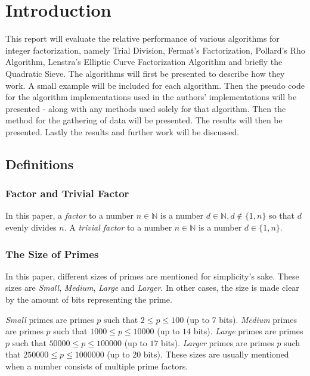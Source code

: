 \chapter{Introduction}

\noindent This report will evaluate the relative performance of various algorithms for integer factorization, namely Trial Division, Fermat's Factorization, Pollard's Rho Algorithm, Lenstra's Elliptic Curve Factorization Algorithm and briefly the Quadratic Sieve. The algorithms will first be presented to describe how they work. A small example will be included for each algorithm. Then the pseudo code for the algorithm implementations used in the authors' implementations will be presented - along with any methods used solely for that algorithm. Then the method for the gathering of data will be presented. The results will then be presented. Lastly the results and further work will be discussed.

\section{Definitions}

\subsection{Factor and Trivial Factor}
In this paper, a \textit{factor} to a number $n\in\mathbb{N}$ is a number $d\in\mathbb{N}, d\notin\{1, n\}$ so that $d$ evenly divides $n$. A \textit{trivial factor} to a number $n\in\mathbb{N}$ is a number $d\in\{1, n\}$.

\subsection{The Size of Primes}
In this paper, different sizes of primes are mentioned for simplicity's sake. These sizes are \textit{Small}, \textit{Medium}, \textit{Large} and \textit{Larger}. In other cases, the size is made clear by the amount of bits representing the prime.

\textit{Small} primes are primes $p$ such that $2\leq p \leq 100$ (up to $7$ bits). \textit{Medium} primes are primes $p$ such that $1000 \leq p \leq 10000$ (up to $14$ bits). \textit{Large} primes are primes $p$ such that $50000\leq p \leq 100000$ (up to $17$ bits). \textit{Larger} primes are primes $p$ such that $250000\leq p \leq 1000000$ (up to $20$ bits). These sizes are usually mentioned when a number consists of multiple prime factors.

